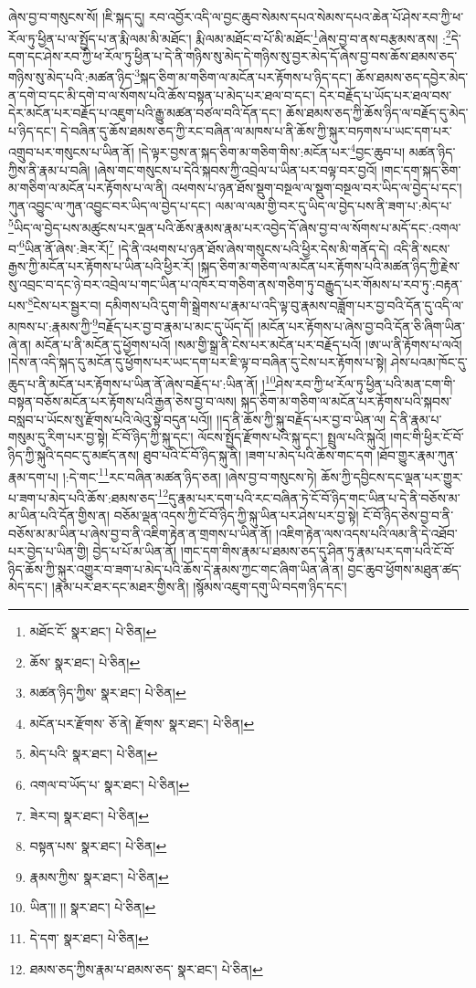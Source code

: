ཞེས་བྱ་བ་གསུངས་སོ། །ཇི་སྐད་དུ། རབ་འབྱོར་འདི་ལ་བྱང་ཆུབ་སེམས་དཔའ་སེམས་དཔའ་ཆེན་པོ་ཤེས་རབ་ཀྱི་ཕ་རོལ་ཏུ་ཕྱིན་པ་ལ་སྤྱོད་པ་ན་རྨི་ལམ་མི་མཐོང་། རྨི་ལམ་མཐོང་བ་པོ་མི་མཐོང་\footnote{མཐོང་ངོ་  སྣར་ཐང་།  པེ་ཅིན། }ཞེས་བྱ་བ་ནས་བརྩམས་ནས། :\footnote{ཆོས་  སྣར་ཐང་།  པེ་ཅིན། }དེ་དག་དང་ཤེས་རབ་ཀྱི་ཕ་རོལ་ཏུ་ཕྱིན་པ་དེ་ནི་གཉིས་སུ་མེད་དེ་གཉིས་སུ་བྱར་མེད་དོ་ཞེས་བྱ་བས་ཆོས་ཐམས་ཅད་གཉིས་སུ་མེད་པའི་:མཚན་ཉིད་\footnote{མཚན་ཉིད་ཀྱིས་  སྣར་ཐང་།  པེ་ཅིན། }སྐད་ཅིག་མ་གཅིག་ལ་མངོན་པར་རྟོགས་པ་ཉིད་དང་། ཆོས་ཐམས་ཅད་དབྱེར་མེད་ན་དགེ་བ་དང་མི་དགེ་བ་ལ་སོགས་པའི་ཆོས་བསྟན་པ་མེད་པར་ཐལ་བ་དང་། དེར་བརྗོད་པ་ཡོད་པར་ཐལ་བས་དེར་མངོན་པར་བརྗོད་པ་འཇུག་པའི་རྒྱུ་མཚན་བཙལ་བའི་དོན་དང་། ཆོས་ཐམས་ཅད་ཀྱི་ཆོས་ཉིད་ལ་བརྗོད་དུ་མེད་པ་ཉིད་དང་། དེ་བཞིན་དུ་ཆོས་ཐམས་ཅད་ཀྱི་རང་བཞིན་ལ་མཁས་པ་ནི་ཆོས་ཀྱི་སྐུར་བཏགས་པ་ཡང་དག་པར་འགྲུབ་པར་གསུངས་པ་ཡིན་ནོ། །དེ་ལྟར་བྱས་ན་སྐད་ཅིག་མ་གཅིག་གིས་:མངོན་པར་\footnote{མངོན་པར་རྫོགས་  ཅོ་ནེ། རྫོགས་  སྣར་ཐང་།  པེ་ཅིན། }བྱང་ཆུབ་པ། མཚན་ཉིད་ཀྱིས་ནི་རྣམ་པ་བཞི། །ཞེས་གང་གསུངས་པ་དེའི་སྐབས་ཀྱི་འབྲེལ་པ་ཡིན་པར་བལྟ་བར་བྱའོ། །གང་དག་སྐད་ཅིག་མ་གཅིག་ལ་མངོན་པར་རྟོགས་པ་ལ་ནི། འཕགས་པ་ཉན་ཐོས་སྡུག་བསྔལ་ལ་སྡུག་བསྔལ་བར་ཡིད་ལ་བྱེད་པ་དང་། ཀུན་འབྱུང་ལ་ཀུན་འབྱུང་བར་ཡིད་ལ་བྱེད་པ་དང་། ལམ་ལ་ལམ་གྱི་བར་དུ་ཡིད་ལ་བྱེད་པས་ནི་ཟག་པ་:མེད་པ་\footnote{མེད་པའི་  སྣར་ཐང་།  པེ་ཅིན། }ཡིད་ལ་བྱེད་པས་མཚུངས་པར་ལྡན་པའི་ཆོས་རྣམས་རྣམ་པར་འབྱེད་དོ་ཞེས་བྱ་བ་ལ་སོགས་པ་མདོ་དང་:འགལ་བ་\footnote{འགལ་བ་ཡོད་པ་  སྣར་ཐང་།  པེ་ཅིན། }ཡིན་ནོ་ཞེས་:ཟེར་རོ།\footnote{ཟེར་བ།  སྣར་ཐང་།  པེ་ཅིན། } །དེ་ནི་འཕགས་པ་ཉན་ཐོས་ཞེས་གསུངས་པའི་ཕྱིར་དེས་མི་གནོད་དེ། འདི་ནི་སངས་རྒྱས་ཀྱི་མངོན་པར་རྟོགས་པ་ཡིན་པའི་ཕྱིར་རོ། །སྐད་ཅིག་མ་གཅིག་ལ་མངོན་པར་རྟོགས་པའི་མཚན་ཉིད་ཀྱི་རྗེས་སུ་འབྲང་བ་དང་ཉེ་བར་འབྲེལ་པ་གང་ཡིན་པ་འཁོར་བ་གཅིག་ནས་གཅིག་ཏུ་བརྒྱུད་པར་གོམས་པ་རབ་ཏུ་:བརྟན་པས་\footnote{བསྟན་པས་  སྣར་ཐང་།  པེ་ཅིན། }ངེས་པར་སྦྱར་བ། དམིགས་པའི་དུག་གི་སྒྲེགས་པ་རྣམ་པ་འདི་ལྟ་བུ་རྣམས་བཟློག་པར་བྱ་བའི་དོན་དུ་འདི་ལ་མཁས་པ་:རྣམས་ཀྱི་\footnote{རྣམས་ཀྱིས་  སྣར་ཐང་།  པེ་ཅིན། }བརྗོད་པར་བྱ་བ་རྣམ་པ་མང་དུ་ཡོད་དོ། །མངོན་པར་རྟོགས་པ་ཞེས་བྱ་བའི་དོན་ཅི་ཞིག་ཡིན་ཞེ་ན། མངོན་པ་ནི་མངོན་དུ་ཕྱོགས་པའོ། །སམ་གྱི་སྒྲ་ནི་ངེས་པར་མངོན་པར་བརྗོད་པའོ། །ཨ་ཡ་ནི་རྟོགས་པ་ལའོ། །དེས་ན་འདི་སྐད་དུ་མངོན་དུ་ཕྱོགས་པར་ཡང་དག་པར་ཇི་ལྟ་བ་བཞིན་དུ་ངེས་པར་རྟོགས་པ་སྟེ། ཤེས་པའམ་ཁོང་དུ་ཆུད་པ་ནི་མངོན་པར་རྟོགས་པ་ཡིན་ནོ་ཞེས་བརྗོད་པ་:ཡིན་ནོ། །\footnote{ཡིན་།། །།  སྣར་ཐང་།  པེ་ཅིན། }ཤེས་རབ་ཀྱི་ཕ་རོལ་ཏུ་ཕྱིན་པའི་མན་ངག་གི་བསྟན་བཅོས་མངོན་པར་རྟོགས་པའི་རྒྱན་ཅེས་བྱ་བ་ལས། སྐད་ཅིག་མ་གཅིག་ལ་མངོན་པར་རྟོགས་པའི་སྐབས་བསླབ་པ་ཡོངས་སུ་རྫོགས་པའི་ལེའུ་སྟེ་བདུན་པའོ།། །།ད་ནི་ཆོས་ཀྱི་སྐུ་བརྗོད་པར་བྱ་བ་ཡིན་ལ། དེ་ནི་རྣམ་པ་གསུམ་དུ་རིག་པར་བྱ་སྟེ། ངོ་བོ་ཉིད་ཀྱི་སྐུ་དང་། ལོངས་སྤྱོད་རྫོགས་པའི་སྐུ་དང་། སྤྲུལ་པའི་སྐུའོ། །གང་གི་ཕྱིར་ངོ་བོ་ཉིད་ཀྱི་སྐུའི་དབང་དུ་མཛད་ནས། ཐུབ་པའི་ངོ་བོ་ཉིད་སྐུ་ནི། །ཟག་པ་མེད་པའི་ཆོས་གང་དག །ཐོབ་གྱུར་རྣམ་ཀུན་རྣམ་དག་པ། །:དེ་གང་\footnote{དེ་དག་  སྣར་ཐང་།  པེ་ཅིན། }རང་བཞིན་མཚན་ཉིད་ཅན། །ཞེས་བྱ་བ་གསུངས་ཏེ། ཆོས་ཀྱི་དབྱིངས་དང་ལྡན་པར་གྱུར་པ་ཟག་པ་མེད་པའི་ཆོས་:ཐམས་ཅད་\footnote{ཐམས་ཅད་ཀྱིས་རྣམ་པ་ཐམས་ཅད་  སྣར་ཐང་།  པེ་ཅིན། }དུ་རྣམ་པར་དག་པའི་རང་བཞིན་ཏེ་ངོ་བོ་ཉིད་གང་ཡིན་པ་དེ་ནི་བཅོས་མ་མ་ཡིན་པའི་དོན་གྱིས་ན། བཅོམ་ལྡན་འདས་ཀྱི་ངོ་བོ་ཉིད་ཀྱི་སྐུ་ཡིན་པར་ཤེས་པར་བྱ་སྟེ། ངོ་བོ་ཉིད་ཅེས་བྱ་བ་ནི་བཅོས་མ་མ་ཡིན་པ་ཞེས་བྱ་བ་ནི་འཇིག་རྟེན་ན་གྲགས་པ་ཡིན་ནོ། །འཇིག་རྟེན་ལས་འདས་པའི་ལམ་ནི་དེ་འཐོབ་པར་བྱེད་པ་ཡིན་གྱི། བྱེད་པ་པོ་མ་ཡིན་ནོ། །གང་དག་གིས་རྣམ་པ་ཐམས་ཅད་དུ་ཤིན་ཏུ་རྣམ་པར་དག་པའི་ངོ་བོ་ཉིད་ཆོས་ཀྱི་སྐུར་འགྱུར་བ་ཟག་པ་མེད་པའི་ཆོས་དེ་རྣམས་ཀྱང་གང་ཞིག་ཡིན་ཞེ་ན། བྱང་ཆུབ་ཕྱོགས་མཐུན་ཚད་མེད་དང་། །རྣམ་པར་ཐར་དང་མཐར་གྱིས་ནི། །སྙོམས་འཇུག་དགུ་ཡི་བདག་ཉིད་དང་། 